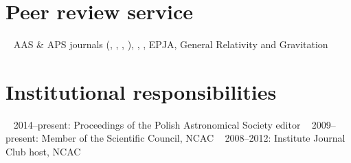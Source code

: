 \documentclass[]{friggeri-cv} %
\begin{document}




\pagebreak

\setlength{\voffset}{0pt}
\begin{aside} 
\section{Peer review service}
~ 
AAS \& APS journals ({\apj}, {\apjl}, {\prd}, {\prl}), 
{\mnras}, {\aap}, EPJA, General Relativity and Gravitation 
~
~ 
\section{Institutional responsibilities}
~
2014--present: Proceedings of the Polish Astronomical Society editor
~
2009--present: Member of the Scientific Council, NCAC 
~
2008--2012: Institute Journal Club host, NCAC
\end{aside} 


%  
\end{document}
